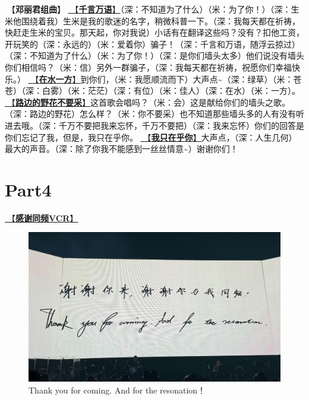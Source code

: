 \documentclass[]{ctexbook}
\begin{document}
🎵【\textbf{邓丽君组曲}】
\hyperref[thousands-of-words]{🎵【\textbf{千言万语}】}（深：不知道为了什么）（米：为了你！）（深：生米他围绕着我）生米是我的歌迷的名字，稍微科普一下。（深：我每天都在祈祷，快赶走生米的宝贝。那天起，你对我说）小话有在翻译这些吗？没有？扣他工资，开玩笑的（深：永远的）（米：爱着你）骗子！（深：千言和万语，随浮云掠过）（深：不知道为了什么）（米：为了你！）（深：是你们墙头太多）他们说没有墙头你们相信吗？（米：信）另外一群骗子，（深：我每天都在祈祷，祝愿你们幸福快乐。）
\hyperref[on-the-water-side]{🎵【\textbf{在水一方}】}到你们，（米：我愿顺流而下）大声点\textasciitilde（深：绿草）（米：苍苍）（深：白雾）（米：茫茫）（深：有位）（米：佳人）（深：在水）（米：一方）。
\hyperref[only-with-me]{🎵【\textbf{路边的野花不要采}】}这首歌会唱吗？（米：会）这是献给你们的墙头之歌。（深：路边的野花）怎么样？（米：你不要采）也不知道那些墙头多的人有没有听进去哦。（深：千万不要把我来忘怀，千万不要把）（深：我来忘怀）你们的回答是你们忘记了我，但是，我只在乎你。
\hyperref[only-you]{🎵【\textbf{我只在乎你}】}大声点，（深：人生几何）最大的声音。（深：除了你我不能感到一丝丝情意\textasciitilde）谢谢你们！

\section{Part4}\label{LasVegas-20250301-part4}

\hyperref[thank-you-vcr]{🎥【\textbf{感谢同频VCR}】}

\begin{figure}

{\centering \includegraphics[width=400pt]{img/lasvegas20250228/thankyou} 

}

\caption{Thank you for coming. And for the resonation！}\label{fig:unnamed-chunk-177}
\end{figure}
\end{document}
